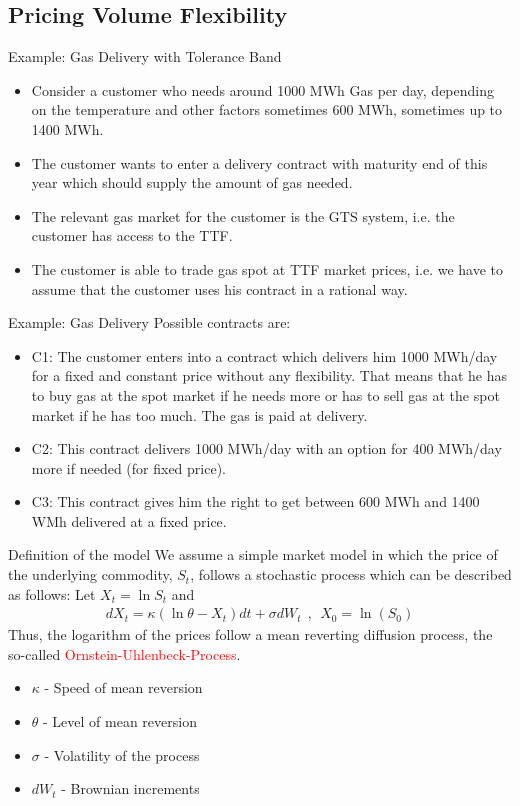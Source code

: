 \subsection{Pricing Volume Flexibility}

{Example: Gas Delivery with Tolerance Band}
\begin{itemize}
\item<1-> Consider a customer who needs around 1000 MWh Gas per day, depending on the temperature and other factors sometimes 600 MWh, sometimes up to 1400 MWh.
\item<2-> The customer wants to enter a delivery contract with maturity end of this year which should supply the amount of gas needed.
\item<3-> The relevant gas market for the customer is the GTS system, i.e. the customer has access to the TTF.
\item<3-> The customer is able to trade gas spot at TTF market prices, i.e. we have to assume that the customer uses his contract in a rational way.
\end{itemize}

{Example: Gas Delivery}
Possible contracts are:
\begin{itemize}
\item<1->  C1: The customer enters into a contract which delivers him 1000 MWh/day for a fixed and constant price without any flexibility. That means that he has to buy gas at the spot market if he needs more or has to sell gas at the spot market if he has too much. The gas is paid at delivery.
\item<2-> C2: This contract delivers 1000 MWh/day with an option for 400 MWh/day more if needed (for fixed price).
\item<3-> C3: This contract gives him the right to get between 600 MWh and 1400 WMh delivered at a fixed price.
\end{itemize}

{Definition of the model}
We assume a simple market model in which the price of the underlying commodity, $S_t$, follows a stochastic process which can be described as follows:
Let $X_t = \ln S_t$ and
\begin{align*}
	dX_t = \kappa (\ln \theta - X_t)dt + \sigma dW_t~~,~~X_0 = \ln(S_0)
\end{align*}
Thus, the logarithm of the prices follow a mean reverting diffusion process, the so-called \textcolor{red}{Ornstein-Uhlenbeck-Process}.\\
\begin{itemize}
\item $\kappa$ - Speed of mean reversion
\item $\theta$ - Level of mean reversion
\item $\sigma$ - Volatility of the process
\item $dW_t$ - Brownian increments
\end{itemize}

